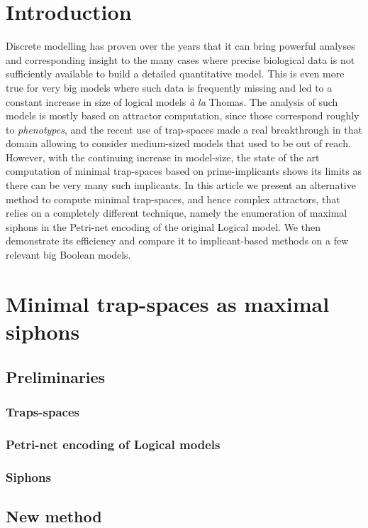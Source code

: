 \documentclass[runningheads]{llncs}
\begin{document}
\section{Introduction}

Discrete modelling has proven over the years that it can bring powerful analyses and corresponding insight to the many cases where precise biological data is not sufficiently available to build a detailed quantitative model.
This is even more true for very big models where such data is frequently missing and led to a constant increase in size of logical models \emph{à la} Thomas.
The analysis of such models is mostly based on attractor computation, since those correspond roughly to \emph{phenotypes}, and the recent use of trap-spaces made a real breakthrough in that domain allowing to consider medium-sized models that used to be out of reach.
However, with the continuing increase in model-size, the state of the art computation of minimal trap-spaces based on prime-implicants shows its limits as there can be very many such implicants.
In this article we present an alternative method to compute minimal trap-spaces, and hence complex attractors, that relies on a completely different technique, namely the enumeration of maximal siphons in the Petri-net encoding of the original Logical model.
We then demonstrate its efficiency and compare it to implicant-based methods on a few relevant big Boolean models.

\section{Minimal trap-spaces as maximal siphons}
\subsection{Preliminaries}
\subsubsection{Traps-spaces}
\subsubsection{Petri-net encoding of Logical models}
\subsubsection{Siphons}

\subsection{New method}
\end{document}
